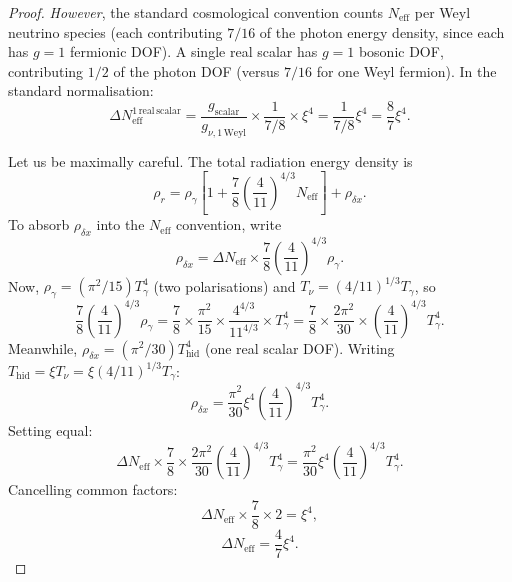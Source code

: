 \documentclass[12pt]{article}
\theoremstyle{plain}
\theoremstyle{definition}
\numberwithin{equation}{section}
\newcommand{\eff}{\mathrm{eff}}
\newcommand{\hid}{\mathrm{hid}}
\begin{document}
\begin{proof}
\emph{However}, the standard cosmological convention counts $N_{\eff}$
per Weyl neutrino species (each contributing $7/16$ of the photon
energy density, since each has $g=1$ fermionic DOF).  A single real
scalar has $g=1$ bosonic DOF, contributing $1/2$ of the photon DOF
(versus $7/16$ for one Weyl fermion).  In the standard normalisation:
\begin{equation}
\Delta N_{\eff}^{\mathrm{1\,real\,scalar}}
= \frac{g_{\mathrm{scalar}}}{g_{\nu,\mathrm{1\,Weyl}}}
\times\frac{1}{7/8}\times\xi^4
= \frac{1}{7/8}\xi^4 = \frac{8}{7}\xi^4.
\end{equation}

Let us be maximally careful.  The total radiation energy density is
\begin{equation}
\rho_r = \rho_\gamma\left[1+\frac{7}{8}\left(\frac{4}{11}\right)^{4/3}N_{\eff}\right]
+ \rho_{\delta x}.
\end{equation}
To absorb $\rho_{\delta x}$ into the $N_{\eff}$ convention, write
\begin{equation}
\rho_{\delta x} = \Delta N_{\eff}\times\frac{7}{8}\left(\frac{4}{11}\right)^{4/3}\rho_\gamma.
\end{equation}
Now, $\rho_\gamma=(\pi^2/15)T_\gamma^4$ (two polarisations) and
$T_\nu=(4/11)^{1/3}T_\gamma$, so
\begin{equation}
\frac{7}{8}\left(\frac{4}{11}\right)^{4/3}\rho_\gamma
= \frac{7}{8}\times\frac{\pi^2}{15}\times\frac{4^{4/3}}{11^{4/3}}\times T_\gamma^4
= \frac{7}{8}\times\frac{2\pi^2}{30}\times\left(\frac{4}{11}\right)^{4/3}T_\gamma^4.
\end{equation}
Meanwhile, $\rho_{\delta x}=(\pi^2/30)T_{\hid}^4$ (one real scalar DOF).
Writing $T_{\hid}=\xi T_\nu=\xi(4/11)^{1/3}T_\gamma$:
\begin{equation}
\rho_{\delta x} = \frac{\pi^2}{30}\xi^4\left(\frac{4}{11}\right)^{4/3}T_\gamma^4.
\end{equation}
Setting equal:
\begin{equation}
\Delta N_{\eff}\times\frac{7}{8}\times\frac{2\pi^2}{30}\left(\frac{4}{11}\right)^{4/3}T_\gamma^4
= \frac{\pi^2}{30}\xi^4\left(\frac{4}{11}\right)^{4/3}T_\gamma^4.
\end{equation}
Cancelling common factors:
\begin{equation}
\Delta N_{\eff}\times\frac{7}{8}\times 2 = \xi^4,
\end{equation}
\begin{equation}
\Delta N_{\eff} = \frac{4}{7}\xi^4.
\end{equation}


\end{proof}
\end{document}
